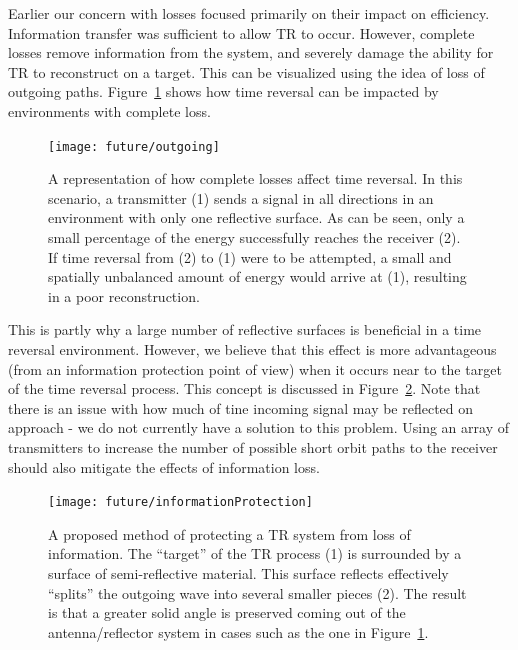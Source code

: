 Earlier our concern with losses focused primarily on their impact on efficiency. Information transfer was sufficient to allow TR to occur. However, complete losses remove information from the system, and severely damage the ability for TR to reconstruct on a target. This can be visualized using the idea of loss of outgoing paths. Figure~\ref{fig:outgo} shows how time reversal can be impacted by environments with complete loss.

\begin{figure}[h]
\centering
\texttt{[image: future/outgoing]}
\caption[Example of information loss on time reversal efficacy]{A representation of how complete losses affect time reversal. In this scenario, a transmitter (1) sends a signal in all directions in an environment with only one reflective surface. As can be seen, only a small percentage of the energy successfully reaches the receiver (2). If time reversal from (2) to (1) were to be attempted, a small and spatially unbalanced amount of energy would arrive at (1), resulting in a poor reconstruction.}
\label{fig:outgo}
\end{figure}

\newpage

This is partly why a large number of reflective surfaces is beneficial in a time reversal environment. However, we believe that this effect is more advantageous (from an information protection point of view) when it occurs near to the target of the time reversal process. This concept is discussed in Figure~\ref{fig:infoProtection}. Note that there is an issue with how much of tine incoming signal may be reflected on approach - we do not currently have a solution to this problem. Using an array of transmitters to increase the number of possible short orbit paths to the receiver should also mitigate the effects of information loss.

\begin{figure}[h]
\centering
\texttt{[image: future/informationProtection]}
\caption[Proposed TR information protection system]{A proposed method of protecting a TR system from loss of information. The ``target'' of the TR process (1) is surrounded by a surface of semi-reflective material. This surface reflects effectively ``splits'' the outgoing wave into several smaller pieces (2). The result is that a greater solid angle is preserved coming out of the antenna/reflector system in cases such as the one in Figure~\ref{fig:outgo}.}
\label{fig:infoProtection}
\end{figure}

